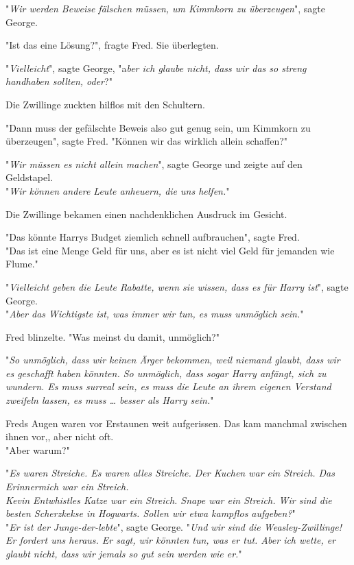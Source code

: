 {"\emph{Wir werden Beweise fälschen müssen, um Kimmkorn zu überzeugen}", sagte George.

"Ist das eine Lösung?", fragte Fred. Sie überlegten.

"\emph{Vielleicht}", sagte George, "a\emph{ber ich glaube nicht, dass wir das so streng handhaben sollten, oder}?"

Die Zwillinge zuckten hilflos mit den Schultern.

"Dann muss der gefälschte Beweis also gut genug sein, um Kimmkorn zu überzeugen", sagte Fred. "Können wir das wirklich allein schaffen?"

"\emph{Wir müssen es nicht allein machen}", sagte George und zeigte auf den Geldstapel.\\ "\emph{Wir können andere Leute anheuern, die uns helfen.}"

Die Zwillinge bekamen einen nachdenklichen Ausdruck im Gesicht.

"Das könnte Harrys Budget ziemlich schnell aufbrauchen", sagte Fred.\\ "Das ist eine Menge Geld für uns, aber es ist nicht viel Geld für jemanden wie Flume."

"\emph{Vielleicht geben die Leute Rabatte, wenn sie wissen, dass es für Harry ist}", sagte George.\\ "\emph{Aber das Wichtigste ist, was immer wir tun, es muss unmöglich sein.}"

Fred blinzelte. "Was meinst du damit, unmöglich?"

"\emph{So unmöglich, dass wir keinen Ärger bekommen, weil niemand glaubt, dass wir es geschafft haben könnten. So unmöglich, dass sogar Harry anfängt, sich zu wundern. Es muss surreal sein, es muss die Leute an ihrem eigenen Verstand zweifeln lassen, es muss … besser als Harry sein.}"

Freds Augen waren vor Erstaunen weit aufgerissen. Das kam manchmal zwischen ihnen vor,, aber nicht oft.\\ "Aber warum?"

"\emph{Es waren Streiche. Es waren alles Streiche. Der Kuchen war ein Streich. Das Erinnermich war ein Streich.\\ Kevin Entwhistles Katze war ein Streich. Snape war ein Streich. Wir sind die besten Scherzkekse in Hogwarts. Sollen wir etwa kampflos aufgeben?}"\\ "\emph{Er ist der Junge-der-lebte}", sagte George. "\emph{Und wir sind die Weasley-Zwillinge!\\ Er fordert uns heraus. Er sagt, wir könnten tun, was er tut. Aber ich wette, er glaubt nicht, dass wir jemals so gut sein werden wie er.}"

}
